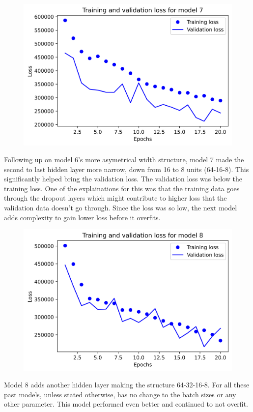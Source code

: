 \documentclass{article}
\begin{document}
    \begin{figure}[H]
        \includegraphics[width=\linewidth]{images/model7.png}
    \end{figure}
    Following up on model 6's more asymetrical width structure, model 7 made the second to last hidden layer more narrow, down from 16 to 8 units 
    (64-16-8). This significantly helped bring the validation loss. The validation loss was below the training loss. One of the explainations 
    for this was that the training data goes through the dropout layers which might contribute to higher loss that the validation data doesn't go 
    through. Since the loss was so low, the next model adds complexity to gain lower loss before it overfits.

    \begin{figure}[H]
        \includegraphics[width=\linewidth]{images/model8.png}
    \end{figure}
    Model 8 adds another hidden layer making the structure 64-32-16-8. For all these past models, unless stated otherwise, has no 
    change to the batch sizes or any other parameter. This model performed even better and continued to not overfit.
\end{document}
